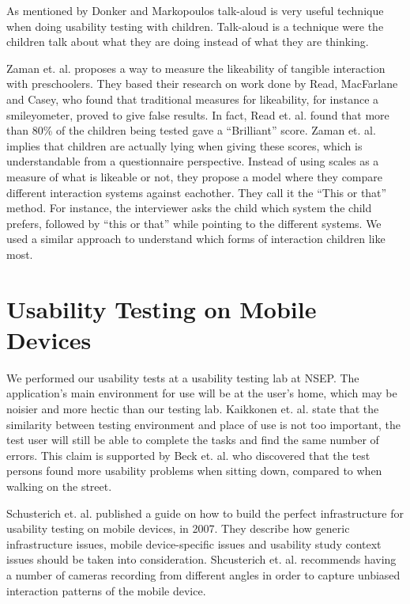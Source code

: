 As mentioned by Donker and Markopoulos\cite{TalkAloud} talk-aloud is very useful technique when doing usability testing with children. Talk-aloud is a technique were the children talk about what they are doing instead of what they are thinking.

Zaman et. al. proposes a way to measure the likeability of tangible interaction with preschoolers\cite{zaman2007measure}. They based their research on work done by Read, MacFarlane and Casey\cite{read2002endurability}, who found that traditional measures for likeability, for instance a smileyometer, proved to give false results. In fact, Read et. al. found that more than 80\% of the children being tested gave a ``Brilliant'' score. Zaman et. al. implies that children are actually lying when giving these scores, which is understandable from a questionnaire perspective. Instead of using scales as a measure of what is likeable or not, they propose a model where they compare different interaction systems against eachother. They call it the ``This or that'' method. For instance, the interviewer asks the child which system the child prefers, followed by ``this or that'' while pointing to the different systems. We used a similar approach to understand which forms of interaction children like most.  


\section{Usability Testing on Mobile Devices}
\label{sec:usabilitytestonmobiledevices}
We performed our usability tests at a usability testing lab at NSEP. The application's main environment for use will be at the user's home, which may be noisier and more hectic than our testing lab. Kaikkonen et. al. state that the similarity between testing environment and place of use is not too important, the test user will still be able to complete the tasks and find the same number of errors\cite{kallio2005usability}. This claim is supported by Beck et. al. who discovered that the test persons found more usability problems when sitting down, compared to when walking on the street\cite{beck2003experimental}. 

Schusterich et. al.\cite{schusteritsch2007towards} published a guide on how to build the perfect infrastructure for usability testing on mobile devices, in 2007. They describe how generic infrastructure issues, mobile device-specific issues and usability study context issues should be taken into consideration. Shcusterich et. al. recommends having a number of cameras recording from different angles in order to capture unbiased interaction patterns of the mobile device. 

